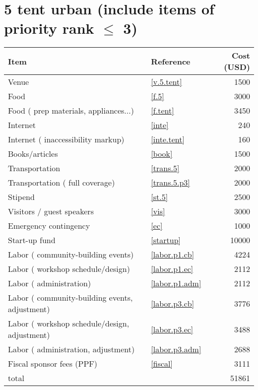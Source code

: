\section*{5 tent urban (include items of priority rank $\leq$ 3)}
\begin{center}
\begin{tabular}{llr}
Item & Reference & Cost (USD) \\ \hline
Venue & \ref{v.5.tent} & 1500 \\
Food & \ref{f.5} & 3000 \\
Food ( prep materials, appliances...) & \ref{f.tent} & 3450 \\
Internet & \ref{inte} & 240 \\
Internet ( inaccessibility markup) & \ref{inte.tent} & 160 \\
Books/articles & \ref{book} & 1500 \\
Transportation & \ref{trans.5} & 2000 \\
Transportation ( full coverage) & \ref{trans.5.p3} & 2000 \\
Stipend & \ref{st.5} & 2500 \\
Visitors / guest speakers & \ref{vis} & 3000 \\
Emergency contingency & \ref{ec} & 1000 \\
Start-up fund & \ref{startup} & 10000 \\
Labor ( community-building events) & \ref{labor.p1.cb} & 4224 \\
Labor ( workshop schedule/design) & \ref{labor.p1.ec} & 2112 \\
Labor ( administration) & \ref{labor.p1.adm} & 2112 \\
Labor ( community-building events, adjustment) & \ref{labor.p3.cb} & 3776 \\
Labor ( workshop schedule/design, adjustment) & \ref{labor.p3.ec} & 3488 \\
Labor ( administration, adjustment) & \ref{labor.p3.adm} & 2688 \\
Fiscal sponsor fees (PPF) & \ref{fiscal} & 3111 \\ \hline
total &  & 51861
\end{tabular}
\end{center}
\newpage
